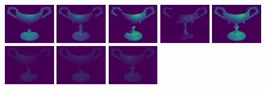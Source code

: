  \includegraphics[width=0.16\textwidth]{ch-psfcn/images/Results/Cast_Shadow/gobletPNG_3_3.jpg}
 \includegraphics[width=0.16\textwidth]{ch-psfcn/images/Results/Cast_Shadow/gobletPNG_4_3.jpg}
 \includegraphics[width=0.16\textwidth]{ch-psfcn/images/Results/Cast_Shadow/gobletPNG_7_3.jpg}
 \includegraphics[width=0.16\textwidth]{ch-psfcn/images/Results/Cast_Shadow/gobletPNG_9_3.jpg}
 \hfill
 \includegraphics[width=0.16\textwidth]{ch-psfcn/images/Results/Cast_Shadow/gobletPNG_3.jpg}
 \\
 \includegraphics[width=0.16\textwidth]{ch-psfcn/images/Results/Cast_Shadow/gobletPNG_0_21.jpg}
 \includegraphics[width=0.16\textwidth]{ch-psfcn/images/Results/Cast_Shadow/gobletPNG_3_21.jpg}
 \includegraphics[width=0.16\textwidth]{ch-psfcn/images/Results/Cast_Shadow/gobletPNG_4_21.jpg}
